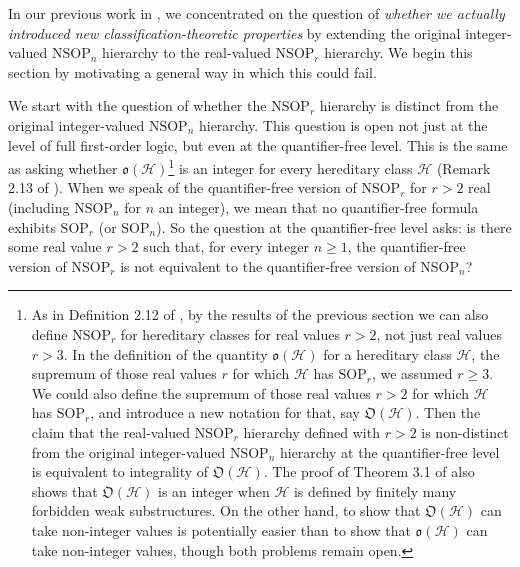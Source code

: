 \documentclass{amsart}
\theoremstyle{definition}
\theoremstyle{remark}
\numberwithin{equation}{section}
\begin{document}
In our previous work in \cite{ApproxOrder}, we concentrated on the question of \textit{whether we actually introduced new classification-theoretic properties} by extending the original integer-valued $\mathrm{NSOP}_{n}$ hierarchy to the real-valued $\mathrm{NSOP}_{r}$ hierarchy. We begin this section by motivating a general way in which this could fail.

We start with the question of whether the $\mathrm{NSOP}_{r}$ hierarchy is distinct from the original integer-valued $\mathrm{NSOP}_{n}$ hierarchy. This question is open not just at the level of full first-order logic, but even at the quantifier-free level. This is the same as asking whether $\mathfrak{o}(\mathcal{H})$\footnote{As in Definition 2.12 of \cite{ApproxOrder}, by the results of the previous section we can also define $\mathrm{NSOP}_{r}$ for hereditary classes for real values $r > 2$, not just real values $r > 3$. In the definition of the quantity $\mathfrak{o}(\mathcal{H})$ for a hereditary class $\mathcal{H}$, the supremum of those real values $r$ for which $\mathcal{H}$ has $\mathrm{SOP}_{r}$, we assumed $r \geq 3$. We could also define the supremum of those real values $r > 2$ for which $\mathcal{H}$ has $\mathrm{SOP}_{r}$, and introduce a new notation for that, say $\mathfrak{O}(\mathcal{H})$. Then the claim that the real-valued $\mathrm{NSOP}_{r}$ hierarchy defined with $r > 2$ is non-distinct from the original integer-valued $\mathrm{NSOP}_{n}$ hierarchy at the quantifier-free level is equivalent to integrality of $\mathfrak{O}(\mathcal{H})$. The proof of Theorem 3.1 of \cite{ApproxOrder} also shows that $\mathfrak{O}(\mathcal{H})$ is an integer when $\mathcal{H}$ is defined by finitely many forbidden weak substructures. On the other hand, to show that $\mathfrak{O}(\mathcal{H})$ can take non-integer values is potentially easier than to show that $\mathfrak{o}(\mathcal{H})$ can take non-integer values, though both problems remain open.} is an integer for every hereditary class $\mathcal{H}$ (Remark 2.13 of \cite{ApproxOrder}). When we speak of the quantifier-free version of $\mathrm{NSOP}_{r}$ for $r > 2$ real (including $\mathrm{NSOP}_{n}$ for $n$ an integer), we mean that no quantifier-free formula exhibits $\mathrm{SOP}_{r}$ (or $\mathrm{SOP}_{n}$). So the question at the quantifier-free level asks: is there some real value $r > 2$ such that, for every integer $n \geq 1$, the quantifier-free version of $\mathrm{NSOP}_{r}$ is not equivalent to the quantifier-free version of $\mathrm{NSOP}_{n}$?
\end{document}
